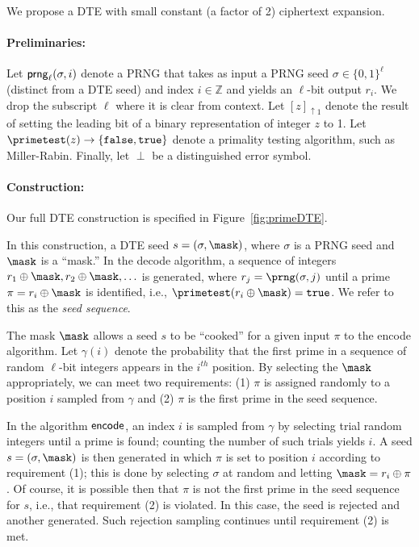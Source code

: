 We propose a DTE with small constant (a factor of 2) ciphertext expansion.

\paragraph{Preliminaries:}
Let ${\sf prng}_{\ell}(\sigma,i)$ denote a PRNG that takes as input a PRNG seed $\sigma \in \{0,1\}^{\ell}$ (distinct from a DTE seed) and index $i \in \mathbb{Z}$ and yields an $\ell$-bit output $r_i$.  We drop the subscript $\ell$ where it is clear from context. Let $[z]_{\uparrow 1}$ denote the result of setting the leading bit of a binary representation of integer $z$ to 1. Let $\primetest(z) \rightarrow \{{\tt false}, {\tt true}\}$ denote a primality testing algorithm, such as Miller-Rabin. Finally, let $\perp$ be a distinguished error symbol.

\paragraph{Construction:}

Our full DTE construction is specified in Figure~\ref{fig:primeDTE}. 

In this construction, a DTE seed $s = (\sigma, \mask)$, where $\sigma$ is a PRNG seed and $\mask$ is a ``mask.'' In the {\sf decode} algorithm, a sequence of integers $r_1 \oplus \mask, r_2 \oplus \mask, \ldots$ is generated, where $r_j = \prng(\sigma, j)$ until a prime $\pi = r_i \oplus \mask$ is identified, i.e., $\primetest(r_i \oplus \mask) = {\tt true}$. We refer to this as the {\em seed sequence}.

The mask $\mask$ allows a seed $s$ to be ``cooked'' for a given input $\pi$ to the {\sf encode} algorithm. Let $\gamma(i)$ denote the probability that the first prime in a sequence of random $\ell$-bit integers appears in the $i^{th}$ position. By selecting the $\mask$ appropriately, we can meet two requirements: (1) $\pi$ is assigned randomly to a position $i$ sampled from $\gamma$ and (2) $\pi$ is the first prime in the seed sequence.

In the algorithm ${\sf encode}$, an index $i$ is sampled from $\gamma$ by selecting trial random integers until a prime is found; counting the number of such trials yields $i$. A seed $s = (\sigma, \mask)$ is then generated in which $\pi$ is set to position $i$ according to requirement (1); this is done by selecting $\sigma$ at random and letting $\mask = r_i \oplus \pi$. Of course, it is possible then that $\pi$ is not the first prime in the seed sequence for $s$, i.e., that requirement (2) is violated. In this case, the seed is rejected and another generated. Such rejection sampling continues until requirement (2) is met.



